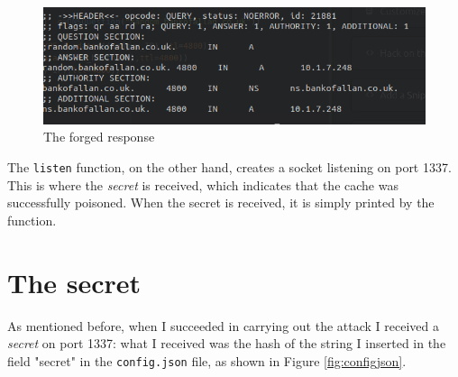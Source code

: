 \documentclass[a4paper]{article}
\begin{document}
	\begin{figure}[H]
		\centering
		\includegraphics[width=1\linewidth]{forged_response}
		\caption{The forged response}
		\label{fig:forgedresponse}
	\end{figure}
	The \texttt{listen} function, on the other hand, creates a socket listening on port 1337. This is where the \textit{secret} is received, which indicates that the cache was successfully poisoned. When the secret is received, it is simply printed by the function.
\section{The secret}
	As mentioned before, when I succeeded in carrying out the attack I received a \textit{secret} on port 1337: what I received was the hash of the string I inserted in the field "secret" in the \texttt{config.json} file, as shown in Figure \ref{fig:configjson}.
\end{document}
